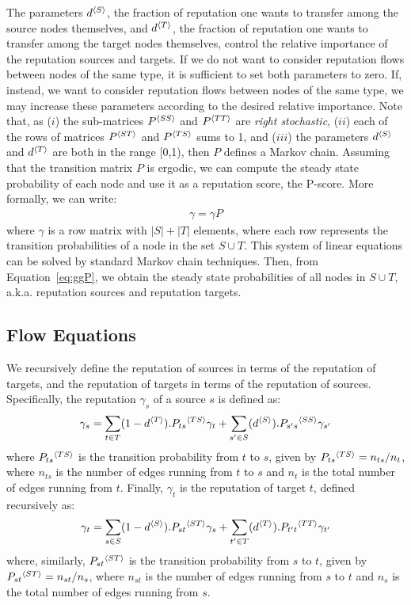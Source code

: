 \documentclass[notitlepage]{svjour3}
\begin{document}
The parameters $d{^{\langle S \rangle}}$, the fraction of reputation one wants to transfer among the source nodes themselves, 
and $d{^{\langle T \rangle}}$, the fraction of reputation one wants to transfer among the target nodes themselves,
control the relative importance of the reputation sources and targets. 
If we do not want to consider reputation flows between nodes of the same type, it is sufficient to set both parameters to zero. If, instead, we want to consider reputation flows between nodes of the same type, we may increase these parameters according to the desired relative importance. Note that, as ($i$) the sub-matrices $P{^{\langle SS \rangle}}$ and $P{^{\langle TT \rangle}}$ are \emph{right stochastic}, ($ii$) each of the rows of matrices $P{^{\langle ST \rangle}}$ and $P{^{\langle TS \rangle}}$ sums to 1, and ($iii$) the parameters $d{^{\langle S \rangle}}$ and $d{^{\langle T \rangle}}$ are both in the range [0,1), then $P$ defines a Markov chain. Assuming that the transition matrix $P$ is ergodic, we can compute the steady state probability of each node 
and use it as a reputation score, the P-score. 
More formally, we can write: 
\begin{align}
\label{eq:ggP}
\gamma = \gamma P
\end{align}
where $\gamma$ is a row matrix with $|S|+|T|$ elements, 
where each row represents the transition probabilities of a node in the set $S\cup T$. 
%
This system of linear equations can be solved by standard Markov chain techniques. %
Then, from Equation~\eqref{eq:ggP}, we obtain the steady state probabilities of all nodes in $S\cup T$, a.k.a. reputation sources and reputation targets.

\subsection{Flow Equations}\label{sec:flow-equations}

We recursively define the reputation of sources in terms of the reputation of targets, and the reputation of targets in terms of the reputation of sources. Specifically, the reputation $\gamma_s$ of a source $s$ is defined as:
\begin{align}
  \gamma_s = \sum_{t \in T} (1-d{^{\langle T \rangle}}).P_{ts}{^{\langle TS \rangle}} \gamma_t + \sum_{s' \in S} (d{^{\langle S \rangle}}).P_{s's}{^{\langle SS \rangle}} \gamma_{s'}\label{eqn:gs}
\end{align}
where $P_{ts}{^{\langle TS \rangle}}$ is the transition probability from $t$ to $s$, given by $P_{ts}{^{\langle TS \rangle}} = n_{ts} / n_t$, where $n_{ts}$ is the number of edges running from $t$ to $s$ and $n_t$ is the total number of edges running from $t$. Finally, $\gamma_t$ is the reputation of target $t$, defined recursively as:
\begin{align}
  \gamma_t = \sum_{s \in S} (1-d{^{\langle S \rangle}}).P_{st}{^{\langle ST \rangle}} \gamma_s + \sum_{t' \in T} (d{^{\langle T \rangle}}).P_{t't}{^{\langle TT \rangle}} \gamma_{t'}\label{eqn:gt}
\end{align}
where, similarly, $P_{st}{^{\langle ST \rangle}}$ is the transition probability from $s$ to $t$, given by $P_{st}{^{\langle ST \rangle}} = n_{st} / n_s$, where $n_{st}$ is the number of edges running from $s$ to $t$ and $n_s$ is the total number of edges running from $s$. 
\end{document}

